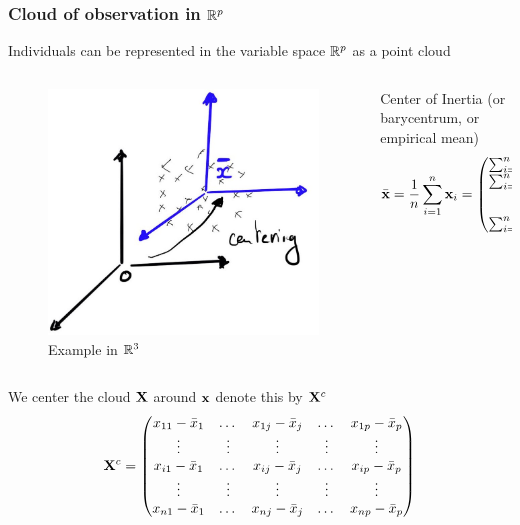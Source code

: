 \documentclass{beamer}\usepackage[]{graphicx}\usepackage[]{color}
\begin{document}
\begin{frame}
  \frametitle{Cloud of observation in $\mathbb{R}^p$}

  Individuals can be represented in the \alert{variable space $\mathbb{R}^p$} as a point cloud

  \begin{columns}
    \begin{column}{.5\textwidth}
      \begin{figure}      
      \includegraphics[width=.6\textwidth]{cloud_centering}
      \vspace{-.25cm}
      \caption{Example in $\mathbb{R}^3$}
      \end{figure}      
    \end{column}

  \begin{column}{.5\textwidth}
    \begin{block}{Center of Inertia}
      (or barycentrum, or empirical mean)
      \[ \bar{\mathbf{x}} = \frac{1}{n} \sum _{i=1}^n \mathbf{x}_i = 
      \begin{pmatrix}
        \sum _{i=1}^n x_{i1}/n \\
        \sum _{i=1}^n x_{i2}/n \\
        \vdots\\
        \sum _{i=1}^n x_{ip}/n
      \end{pmatrix}
      \]
    \end{block}
  \end{column}
  \end{columns}

  We center the cloud $\mathbf{X}$ around $\mathbf{x}$ denote this by $\mathbf{X}^c$
  \begin{equation*}
    \mathbf{X}^c = \begin{pmatrix}
    x_{11} - \bar{x}_1 &   \dots & x_{1j}  - \bar{x}_j & \dots  & x_{1p} - \bar{x}_p   \cr
              \vdots   &  \vdots & \vdots              & \vdots & \vdots  \cr
    x_{i1} - \bar{x}_1 &   \dots & x_{ij} - \bar{x}_j  & \dots  & x_{ip}  - \bar{x}_p \cr
              \vdots   &  \vdots & \vdots              & \vdots & \vdots  \cr
    x_{n1} - \bar{x}_1 &  \dots  & x_{nj} - \bar{x}_j  & \dots  & x_{np}  - \bar{x}_p \cr
    \end{pmatrix}
  \end{equation*}

\end{frame}
\end{document}
